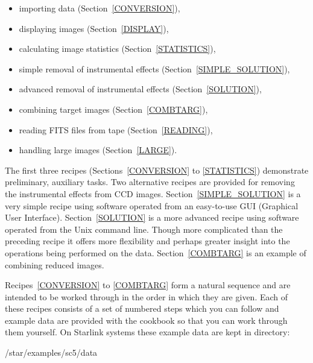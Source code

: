 \documentclass[twoside,11pt]{starlink}
\begin{document}
\begin{itemize}

  \item importing data (Section~\ref{CONVERSION}),

  \item displaying images (Section~\ref{DISPLAY}),

  \item calculating image statistics (Section~\ref{STATISTICS}),

  \item simple removal of instrumental effects
   (Section~\ref{SIMPLE_SOLUTION}),

  \item advanced removal of instrumental effects (Section~\ref{SOLUTION}),

  \item combining target images (Section~\ref{COMBTARG}),

  \item reading FITS files from tape (Section~\ref{READING}),

  \item handling large images (Section~\ref{LARGE}).

\end{itemize}

The first three recipes (Sections~\ref{CONVERSION} to \ref{STATISTICS})
demonstrate preliminary, auxiliary tasks.  Two alternative recipes are
provided for removing the instrumental effects from CCD images.
Section~\ref{SIMPLE_SOLUTION} is a very simple recipe using software
operated from an easy-to-use GUI (Graphical User Interface).
Section~\ref{SOLUTION} is a more advanced recipe using software operated
from the Unix command line.  Though more complicated than the preceding
recipe it offers more flexibility and perhaps greater insight into the
operations being performed on the data.  Section~\ref{COMBTARG} is an
example of combining reduced images.

Recipes~\ref{CONVERSION} to \ref{COMBTARG} form a natural sequence and are
intended to be worked through in the order in which they are given.  Each
of these recipes consists of a set of numbered steps which you can follow
and example data are provided with the cookbook so that you can work through
them yourself.  On Starlink systems these example data are kept in directory:

\begin{terminalv}
/star/examples/sc5/data
\end{terminalv}
\end{document}
